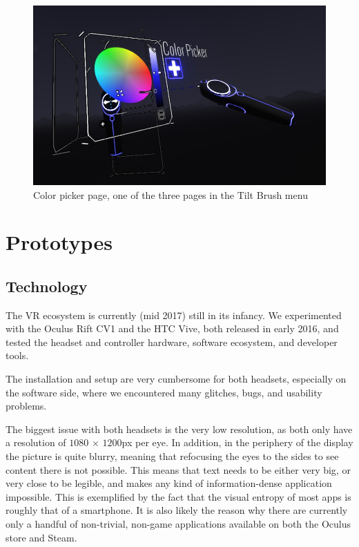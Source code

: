 \documentclass{tufte-book} %
\begin{document}
\begin{figure}
  \includegraphics{tiltbrushmenu.png}
  \caption{Color picker page, one of the three pages in the Tilt Brush menu}
  \label{fig:tiltbrushmenu}
\end{figure}



\chapter{Prototypes}
\label{ch:prototypes}

\section{Technology}
The \textsc{VR} ecosystem is currently (mid 2017) still in its infancy. We experimented with the Oculus Rift \textsc{CV1} and the \textsc{HTC} Vive, both released in early 2016, and tested the headset and controller hardware, software ecosystem, and developer tools.

The installation and setup are very cumbersome for both headsets, especially on the software side, where we encountered many glitches, bugs, and usability problems.

The biggest issue with both headsets is the very low resolution, as both only have a resolution of $1080$ $\times$ $1200$px per eye. In addition, in the periphery of the display the picture is quite blurry, meaning that refocusing the eyes to the sides to see content there is not possible. This means that text needs to be either very big, or very close to be legible, and makes any kind of information-dense application impossible. This is exemplified by the fact that the visual entropy of most apps is roughly that of a smartphone. It is also likely the reason why there are currently only a handful of non-trivial, non-game applications available on both the Oculus store and Steam.
\end{document}
